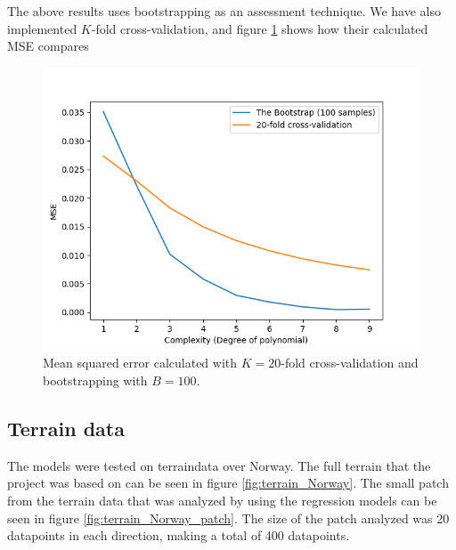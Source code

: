 \documentclass[../main.tex]{subfiles}
\begin{document}
The above results uses bootstrapping as an assessment technique. We have also implemented $K$-fold cross-validation, and figure \ref{fig:result_cv_boot_mse} shows how their calculated MSE compares

\begin{figure}[h]
    \centering
    \includegraphics[width=\textwidth]{../assets/cv_boot_mse.png}
    \caption{Mean squared error calculated with $K=20$-fold cross-validation and bootstrapping with $B=100$.}
    \label{fig:result_cv_boot_mse}
\end{figure}

\subsection{Terrain data}
The models were tested on terraindata over Norway. The full terrain that the project was based on can be seen in figure \ref{fig:terrain_Norway}. The small patch from the terrain data that was analyzed by using the regression models can be seen in figure \ref{fig:terrain_Norway_patch}. The size of the patch analyzed was 20 datapoints in each direction, making a total of 400 datapoints.
\end{document}
